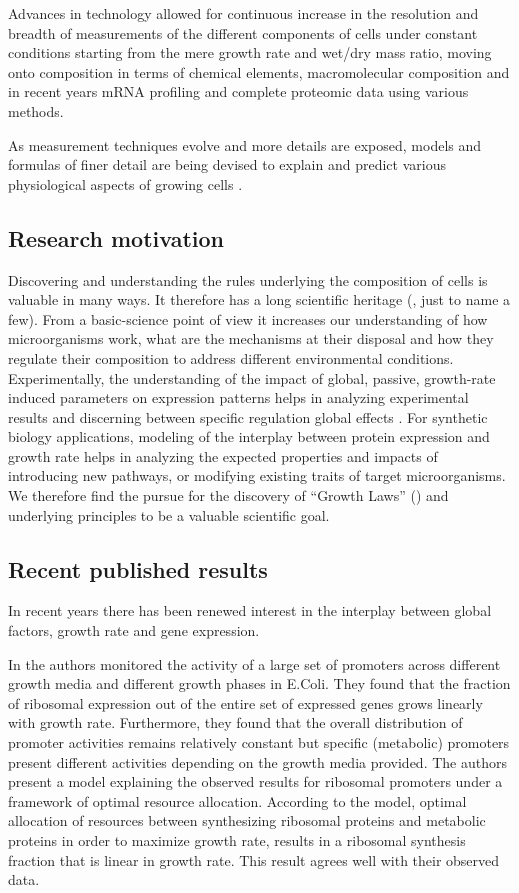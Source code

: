 \documentclass[a4page,notitlepage]{article}
\begin{document}
Advances in technology allowed for continuous increase in the resolution and breadth of measurements of the different components of cells under constant conditions starting from the mere growth rate and wet/dry mass ratio, moving onto composition in terms of chemical elements, macromolecular composition and in recent years mRNA profiling and complete proteomic data using various methods.

As measurement techniques evolve and more details are exposed, models and formulas of finer detail are being devised to explain and predict various physiological aspects of growing cells \cite{Scott2010b,Lerman2012,Karr2012}.
\subsection{Research motivation}
Discovering and understanding the rules underlying the composition of cells is valuable in many ways.
It therefore has a long scientific heritage (\cite{Schaechter1958, Maaloe1969, Bremer1987, Klumpp2009a}, just to name a few).
From a basic-science point of view it increases our understanding of how microorganisms work, what are the mechanisms at their disposal and how they regulate their composition to address different environmental conditions.
Experimentally, the understanding of the impact of global, passive, growth-rate induced parameters on expression patterns helps in analyzing experimental results and discerning between specific regulation global effects \cite{loven2012}.
For synthetic biology applications, modeling of the interplay between protein expression and growth rate helps in analyzing the expected properties and impacts of introducing new pathways, or modifying existing traits of target microorganisms.
We therefore find the pursue for the discovery of ``Growth Laws'' (\cite{Scott2010b}) and underlying principles to be a valuable scientific goal.
\subsection{Recent published results}
In recent years there has been renewed interest in the interplay between global factors, growth rate and gene expression.

In \cite{Zaslaver2009a} the authors monitored the activity of a large set of promoters across different growth media and different growth phases in E.Coli.
They found that the fraction of ribosomal expression out of the entire set of expressed genes grows linearly with growth rate.
Furthermore, they found that the overall distribution of promoter activities remains relatively constant but specific (metabolic) promoters present different activities depending on the growth media provided.
The authors present a model explaining the observed results for ribosomal promoters under a framework of optimal resource allocation.
According to the model, optimal allocation of resources between synthesizing ribosomal proteins and metabolic proteins in order to maximize growth rate, results in a ribosomal synthesis fraction that is linear in growth rate.
This result agrees well with their observed data.
\end{document}
